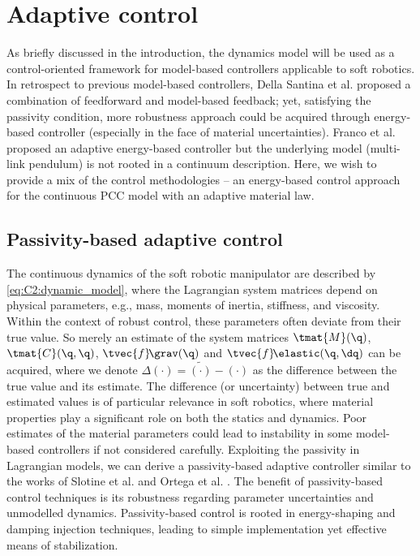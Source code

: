 \section{Adaptive control}
\noindent As briefly discussed in the introduction, the dynamics model will be used as a control-oriented framework for model-based controllers applicable to soft robotics. In retrospect to previous model-based controllers, Della Santina et al.  \cite{DellaSantina2020} proposed a combination of feedforward and model-based feedback; yet, satisfying the passivity condition, more robustness approach could be acquired through energy-based controller (especially in the face of material uncertainties). Franco et al. \cite{Franco2020} proposed an adaptive energy-based controller but the underlying model (multi-link pendulum) is not rooted in a continuum description. Here, we wish to provide a mix of the control methodologies -- an energy-based control approach for the continuous PCC model with an adaptive material law.
%
\subsection{Passivity-based adaptive control}
\noindent The continuous dynamics of the soft robotic manipulator are described by \eqref{eq:C2:dynamic_model}, where the Lagrangian system matrices depend on physical parameters, e.g., mass, moments of inertia, stiffness, and viscosity. Within the context of robust control, these parameters often deviate from their true value. So merely an estimate of the system matrices $\tmat{M}(\q)$, $\tmat{C}(\q,\q)$, $\tvec{f}\!\grav(\q)$ and $\tvec{f}\!\elastic(\q,\dq)$ can be acquired, where we denote $
\Delta (\cdot) = \tilde{(\cdot)} - (\cdot)$ as the difference between the true value and its estimate. The difference (or uncertainty) between true and estimated values is of particular relevance in soft robotics, where material properties play a significant role on both the statics and dynamics. Poor estimates of the material parameters could lead to instability in some model-based controllers if not considered carefully. Exploiting the passivity in Lagrangian models, we can derive a passivity-based adaptive controller similar to the works of Slotine et al. \cite{Slotine1988} and Ortega et al. \cite{Ortega1998}. The benefit of passivity-based control techniques is its robustness regarding parameter uncertainties and unmodelled dynamics. Passivity-based control is rooted in energy-shaping and damping injection techniques, leading to simple implementation yet effective means of stabilization.
%

